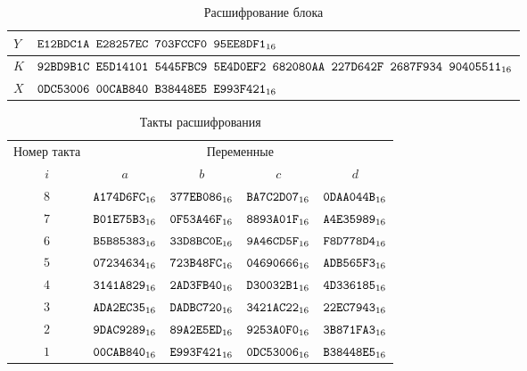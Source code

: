 \begin{table}[H]
\caption{Расшифрование блока}\label{Table.TEST.BlockD}
\begin{tabular}{|l|l|}
\hline
$Y$ &
$\texttt{E12BDC1A~E28257EC~703FCCF0~95EE8DF1}_{16}$\\
\hline
$K$ & 
$\texttt{92BD9B1C~E5D14101~5445FBC9~5E4D0EF2~682080AA~227D642F~2687F934~90405511}_{16}$\\
\dhline
$X$ &
$\texttt{0DC53006~00CAB840~B38448E5~E993F421}_{16}$\\
\hline
\end{tabular}
\end{table}

\begin{table}[H]
\caption{Такты расшифрования}\label{Table.TEST.BlockDRounds}
\begin{tabular}{|c|c|c|c|c|}
\hline
Номер такта  & \multicolumn{4}{|c|}{Переменные}\\
\cline{2-5}
$i$  &$a$&$b$&$c$&$d$\\
\hline
\hline
$8$&$\texttt{A174D6FC}_{16}$&$\texttt{377EB086}_{16}$&$\texttt{BA7C2D07}_{16}$&$\texttt{0DAA044B}_{16}$\\
\hline                                                      
$7$&$\texttt{B01E75B3}_{16}$&$\texttt{0F53A46F}_{16}$&$\texttt{8893A01F}_{16}$&$\texttt{A4E35989}_{16}$\\
\hline                                                      
$6$&$\texttt{B5B85383}_{16}$&$\texttt{33D8BC0E}_{16}$&$\texttt{9A46CD5F}_{16}$&$\texttt{F8D778D4}_{16}$\\
\hline                                                      
$5$&$\texttt{07234634}_{16}$&$\texttt{723B48FC}_{16}$&$\texttt{04690666}_{16}$&$\texttt{ADB565F3}_{16}$\\
\hline                                                      
$4$&$\texttt{3141A829}_{16}$&$\texttt{2AD3FB40}_{16}$&$\texttt{D30032B1}_{16}$&$\texttt{4D336185}_{16}$\\
\hline                                                      
$3$&$\texttt{ADA2EC35}_{16}$&$\texttt{DADBC720}_{16}$&$\texttt{3421AC22}_{16}$&$\texttt{22EC7943}_{16}$\\
\hline                                                      
$2$&$\texttt{9DAC9289}_{16}$&$\texttt{89A2E5ED}_{16}$&$\texttt{9253A0F0}_{16}$&$\texttt{3B871FA3}_{16}$\\
\hline                                                      
$1$&$\texttt{00CAB840}_{16}$&$\texttt{E993F421}_{16}$&$\texttt{0DC53006}_{16}$&$\texttt{B38448E5}_{16}$\\
\hline
\end{tabular}
\end{table}
